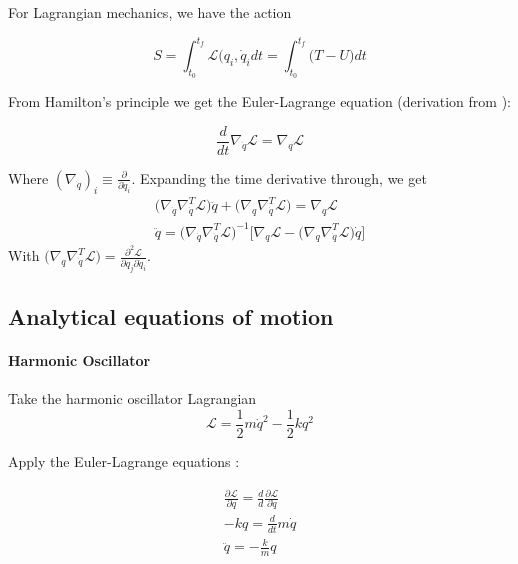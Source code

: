 \documentclass[]{article}
\begin{document}
For Lagrangian mechanics\cite{Taylor2005}, we have the action

\begin{equation}
	S = \int_{t_0}^{t_f} \mathcal{L} (q_i,\dot{q}_i dt = \int_{t_0}^{t_f} \big(  T-U \big)dt
\end{equation}

From Hamilton's principle we get the Euler-Lagrange equation (derivation from \cite{Cranmer2020}):

\begin{equation}
	\frac{d}{dt}\nabla_{\dot{q}} \mathcal{L}= \nabla_{q} \mathcal{L}
\end{equation}

Where $(\nabla_{\dot{q}})_i \equiv \frac{\partial}{\partial \dot{q}_i}$. Expanding the time derivative through, we get
\begin{eqnarray}
	\big( \nabla_{\dot{q}} \nabla_{\dot{q}}^T \mathcal{L} \big) \ddot{q} + \big( \nabla_q \nabla_{\dot{q}}^T \mathcal{L}\big)= \nabla_q \mathcal{L} \\
	\ddot{q} = \big( \nabla_{\dot{q}} \nabla_{\dot{q}}^T \mathcal{L} \big)^{-1} \big[ \nabla_q \mathcal{L} - \big( \nabla_q \nabla_{\dot{q}}^T \mathcal{L}\big) \dot{q}\big]
\end{eqnarray}
With $\big( \nabla_q \nabla_{\dot{q}}^T \mathcal{L}\big) = \frac{\partial^2 \mathcal{L}}{\partial q_j \partial \dot{q}_i}$. 

\subsection{Analytical equations of motion}

\paragraph{Harmonic Oscillator}

Take the harmonic oscillator Lagrangian 
\begin{equation}
	\mathcal{L} = \frac{1}{2}m \dot{q}^2 - \frac{1}{2}k q^2
\end{equation}

Apply the Euler-Lagrange equations \cite{Taylor2005}:

\begin{eqnarray}
	\frac{\partial \mathcal{L}}{\partial q} = \frac{d}{d} \frac{\partial \mathcal{L}}{\partial \dot{q}} \\
	-kq = \frac{d}{dt} m\dot{q} \\
	\ddot{q} = -\frac{k}{m} q
\end{eqnarray}
\end{document}
